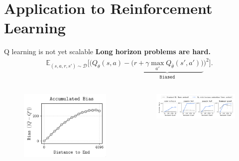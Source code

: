 \documentclass{beamer}
\begin{document}
\section{Application to Reinforcement Learning}
\begin{frame}{Q learning is not yet scalable \citep{parkQlearningNotScalable2025}}
    \textbf{Long horizon problems are hard.}
    \begin{align*}
\mathbb{E}_{(s,a,r,s')\sim \mathcal{D}}\bigg[\Big(Q_\theta(s,a)-\underbrace{\big(r+\gamma \max_{a'}Q_{\bar{\theta}}(s',a')\big)}_{\texttt{Biased}}\Big)^2\bigg]
    .\end{align*}
    \begin{columns}
        \hspace*{-1cm}
        \begin{column}{0.3\linewidth}
        \begin{figure}
            \centering
            \includegraphics[width=\linewidth]{figures/bias_accumulation.png}
        \end{figure}
       \end{column} 
       \hspace*{-1cm}
       \begin{column}{0.69\linewidth}
        \vspace*{-.5cm}
        \begin{figure}
            \centering
            \includegraphics[width=1.1\linewidth]{figures/horizon-reduction.png}
        \end{figure}
       \end{column}
    \end{columns}
\end{frame}
\end{document}
